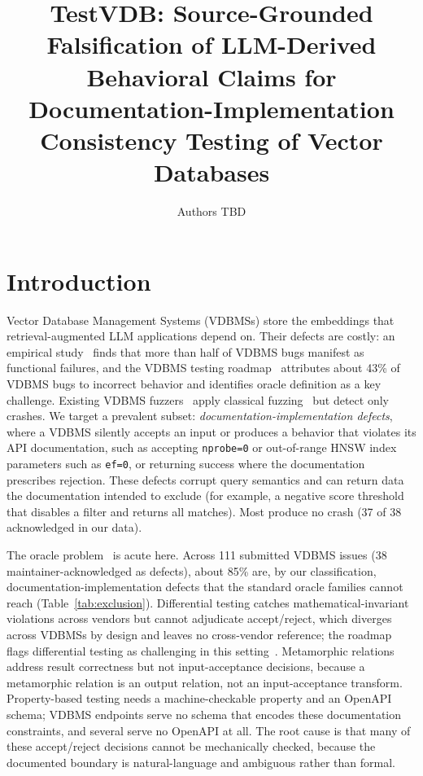 \documentclass[sigconf]{acmart}
\title[TestVDB: source-grounded falsification for VDBMS API documentation-implementation consistency]{TestVDB: Source-Grounded Falsification of LLM-Derived Behavioral Claims for Documentation-Implementation Consistency Testing of Vector Databases}
\author{Authors TBD}
\affiliation{\institution{TBD (anonymity depends on venue)}\country{TBD}}
\begin{document}
\maketitle

\section{Introduction}

Vector Database Management Systems (VDBMSs) store the embeddings that retrieval-augmented LLM applications depend on. Their defects are costly: an empirical study~\cite{bugstudy25} finds that more than half of VDBMS bugs manifest as functional failures, and the VDBMS testing roadmap~\cite{roadmap25} attributes about 43\% of VDBMS bugs to incorrect behavior and identifies oracle definition as a key challenge. Existing VDBMS fuzzers~\cite{vdbfuzz26} apply classical fuzzing~\cite{manes21} but detect only crashes. We target a prevalent subset: \emph{documentation-implementation defects}, where a VDBMS silently accepts an input or produces a behavior that violates its API documentation, such as accepting \texttt{nprobe=0} or out-of-range HNSW index parameters such as \texttt{ef=0}, or returning success where the documentation prescribes rejection. These defects corrupt query semantics and can return data the documentation intended to exclude (for example, a negative score threshold that disables a filter and returns all matches). Most produce no crash (37 of 38 acknowledged in our data).

The oracle problem~\cite{barr15} is acute here. Across 111 submitted VDBMS issues (38 maintainer-acknowledged as defects), about 85\% are, by our classification, documentation-implementation defects that the standard oracle families cannot reach (Table~\ref{tab:exclusion}). Differential testing catches mathematical-invariant violations across vendors but cannot adjudicate accept/reject, which diverges across VDBMSs by design and leaves no cross-vendor reference; the roadmap flags differential testing as challenging in this setting~\cite{roadmap25}. Metamorphic relations~\cite{metmap24} address result correctness but not input-acceptance decisions, because a metamorphic relation is an output relation, not an input-acceptance transform. Property-based testing needs a machine-checkable property and an OpenAPI schema; VDBMS endpoints serve no schema that encodes these documentation constraints, and several serve no OpenAPI at all. The root cause is that many of these accept/reject decisions cannot be mechanically checked, because the documented boundary is natural-language and ambiguous rather than formal.
\end{document}
